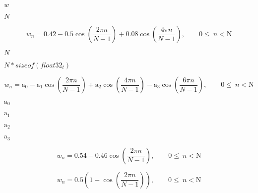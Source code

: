 \documentclass{article}
\begin{document}
$w$
\pagebreak

$N$
\pagebreak

\[ w_n = \mathrm{0.42} - 0.5 \cos\left( \frac{2\pi n}{N-1} \right) + 0.08 \cos\left( \frac{4\pi n}{N-1} \right),\qquad \mathrm{0} \le\ n < \mathrm{N} \]
\pagebreak

$ N $
\pagebreak

$ N*sizeof(float32_t) $
\pagebreak

\[ w_n = \mathrm{a_0} - \mathrm{a_1} \cos\left( \frac{2\pi n}{N-1} \right) + \mathrm{a_2} \cos\left( \frac{4\pi n}{N-1} \right) - \mathrm{a_3} \cos\left( \frac{6\pi n}{N-1} \right),\qquad \mathrm{0} \le\ n < \mathrm{N} \]
\pagebreak

$\mathrm{a}_0$
\pagebreak

$\mathrm{a}_1$
\pagebreak

$\mathrm{a}_2$
\pagebreak

$\mathrm{a}_3$
\pagebreak

\[ w_n = \mathrm{0.54} - \mathrm{0.46} \cos\left( \frac{2\pi n}{N-1}\right), \qquad \mathrm{0} \le\ n < \mathrm{N} \]
\pagebreak

\[ w_n = \mathrm{0.5} \left(\mathrm{1} - \cos\left( \frac{2\pi n}{N-1} \right)\right),\qquad \mathrm{0} \le\ n < \mathrm{N} \]
\pagebreak
\end{document}
